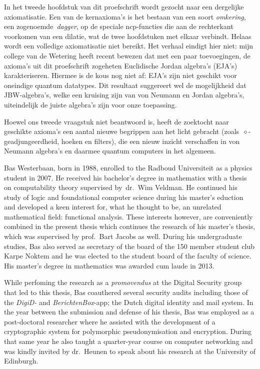 In het tweede hoofdstuk van dit proefschrift
    wordt gezocht naar een dergelijke axiomatisatie.
        Een van de kernaxioma's is het bestaan
            van een soort \emph{omkering}, een zogenoemde~\emph{dagger},
            op de speciale ncp-functies die aan de rechterkant
            voorkomen van een dilatie,
            wat de twee hoofdstuken met elkaar verbindt.
Helaas wordt een volledige axiomatisatie niet bereikt.
Het verhaal eindigt hier niet:
    mijn college van de Wetering
        heeft recent bewezen dat met een paar toevoegingen,
        de axioma's uit dit proefschrift
        zogeheten Euclidische Jordan algebra's (EJA's) karakteriseren.
Hiermee is de kous nog niet af:
    EJA's zijn niet geschikt voor oneindige quantum datatypes.
Dit resultaat suggereert wel de mogelijkheid
    dat JBW-algebra's,
        welke een kruising zijn van von Neumann en Jordan algebra's,
    uiteindelijk de juiste algebra's zijn voor onze toepassing.

Hoewel ons tweede vraagstuk niet beantwoord is, heeft de zoektocht
    naar geschikte axioma's een aantal nieuwe begrippen aan het licht
    gebracht (zoals~$\diamond$-geadjun\-geerdheid, hoeken en filters), die een
    nieuw inzicht verschaffen in von Neumann algebra's
        en daarmee quantum computers in het algemeen.


Bas Westerbaan, born in 1988,
    enrolled to the Radboud Universiteit
     as a physics student in 2007.
He received his bachelor's degree in
    mathematics with a thesis on computability theory
    supervised by~dr.~Wim Veldman.
He continued his study of logic and foundational computer science
    during his master's eduction and developed a keen interest for,
     what he thought to be, an unrelated mathematical field:
        functional analysis.
These interests however, are conveniently combined in the present thesis
    which continues the research of his master's thesis,
    which was supervised by prof.~Bart Jacobs as well.
During his undergraduate studies,
    Bas also served as secretary of the board of the 150 member student club
        Karpe Noktem and he was elected to
        the student board of the faculty of science.
His master's degree in mathematics was awarded cum laude in 2013.

While perfoming the research as a \emph{promovendus}
    at the Digital Security group that led to this thesis,
    Bas coauthered several security audits
        including those of the \emph{DigiD-} and \emph{BerichtenBox}-app;
        the Dutch digital identity and mail system. 
In the year between the submission and defense
    of his thesis, Bas was employed as a post-doctoral researcher
    where he assisted with the development of a cryptographic system
    for polymorphic pseudonymisation and encryption.
During that same year he also taught a quarter-year course on
    computer networking
        and was kindly invited by dr.~Heunen
        to speak about his research at the University of Edinburgh.

